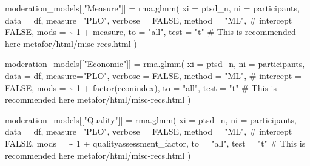 \documentclass[
  letterpaper,
  DIV=11,
  numbers=noendperiod]{scrartcl}
\newenvironment{Shaded}{\begin{snugshade}}{\end{snugshade}}
\newcommand{\AttributeTok}[1]{\textcolor[rgb]{0.40,0.45,0.13}{#1}}
\newcommand{\CommentTok}[1]{\textcolor[rgb]{0.37,0.37,0.37}{#1}}
\newcommand{\ConstantTok}[1]{\textcolor[rgb]{0.56,0.35,0.01}{#1}}
\newcommand{\DecValTok}[1]{\textcolor[rgb]{0.68,0.00,0.00}{#1}}
\newcommand{\FunctionTok}[1]{\textcolor[rgb]{0.28,0.35,0.67}{#1}}
\newcommand{\NormalTok}[1]{\textcolor[rgb]{0.00,0.23,0.31}{#1}}
\newcommand{\OtherTok}[1]{\textcolor[rgb]{0.00,0.23,0.31}{#1}}
\newcommand{\SpecialCharTok}[1]{\textcolor[rgb]{0.37,0.37,0.37}{#1}}
\newcommand{\StringTok}[1]{\textcolor[rgb]{0.13,0.47,0.30}{#1}}
\begin{document}
\begin{Shaded}
\begin{Highlighting}[]
\NormalTok{moderation\_models[[}\StringTok{"Measure"}\NormalTok{]] }\OtherTok{=} \FunctionTok{rma.glmm}\NormalTok{(}
  \AttributeTok{xi =} \StringTok{\textasciigrave{}}\AttributeTok{ptsd\_n}\StringTok{\textasciigrave{}}\NormalTok{, }
  \AttributeTok{ni =} \StringTok{\textasciigrave{}}\AttributeTok{participants}\StringTok{\textasciigrave{}}\NormalTok{, }
  \AttributeTok{data =}\NormalTok{ df, }
  \AttributeTok{measure=}\StringTok{"PLO"}\NormalTok{,}
  \AttributeTok{verbose =} \ConstantTok{FALSE}\NormalTok{,}
  \AttributeTok{method =} \StringTok{"ML"}\NormalTok{,}
  \CommentTok{\# intercept = FALSE,}
  \AttributeTok{mods =} \SpecialCharTok{\textasciitilde{}} \DecValTok{1} \SpecialCharTok{+}\NormalTok{ measure,}
  \AttributeTok{to =} \StringTok{"all"}\NormalTok{,}
  \AttributeTok{test =} \StringTok{"t"} \CommentTok{\# This is recommended here metafor/html/misc{-}recs.html}
\NormalTok{)}

\NormalTok{moderation\_models[[}\StringTok{"Economic"}\NormalTok{]] }\OtherTok{=} \FunctionTok{rma.glmm}\NormalTok{(}
  \AttributeTok{xi =} \StringTok{\textasciigrave{}}\AttributeTok{ptsd\_n}\StringTok{\textasciigrave{}}\NormalTok{, }
  \AttributeTok{ni =} \StringTok{\textasciigrave{}}\AttributeTok{participants}\StringTok{\textasciigrave{}}\NormalTok{, }
  \AttributeTok{data =}\NormalTok{ df, }
  \AttributeTok{measure=}\StringTok{"PLO"}\NormalTok{,}
  \AttributeTok{verbose =} \ConstantTok{FALSE}\NormalTok{,}
  \AttributeTok{method =} \StringTok{"ML"}\NormalTok{,}
  \CommentTok{\# intercept = FALSE,}
  \AttributeTok{mods =} \SpecialCharTok{\textasciitilde{}} \DecValTok{1} \SpecialCharTok{+} \FunctionTok{factor}\NormalTok{(econindex),}
  \AttributeTok{to =} \StringTok{"all"}\NormalTok{,}
  \AttributeTok{test =} \StringTok{"t"} \CommentTok{\# This is recommended here metafor/html/misc{-}recs.html}
\NormalTok{)}

\NormalTok{moderation\_models[[}\StringTok{"Quality"}\NormalTok{]] }\OtherTok{=} \FunctionTok{rma.glmm}\NormalTok{(}
  \AttributeTok{xi =} \StringTok{\textasciigrave{}}\AttributeTok{ptsd\_n}\StringTok{\textasciigrave{}}\NormalTok{, }
  \AttributeTok{ni =} \StringTok{\textasciigrave{}}\AttributeTok{participants}\StringTok{\textasciigrave{}}\NormalTok{, }
  \AttributeTok{data =}\NormalTok{ df, }
  \AttributeTok{measure=}\StringTok{"PLO"}\NormalTok{,}
  \AttributeTok{verbose =} \ConstantTok{FALSE}\NormalTok{,}
  \AttributeTok{method =} \StringTok{"ML"}\NormalTok{,}
  \CommentTok{\# intercept = FALSE,}
  \AttributeTok{mods =} \SpecialCharTok{\textasciitilde{}} \DecValTok{1} \SpecialCharTok{+}\NormalTok{ qualityassessment\_factor,}
  \AttributeTok{to =} \StringTok{"all"}\NormalTok{,}
  \AttributeTok{test =} \StringTok{"t"} \CommentTok{\# This is recommended here metafor/html/misc{-}recs.html}
\NormalTok{)}


\end{Highlighting}
\end{Shaded}
\end{document}
